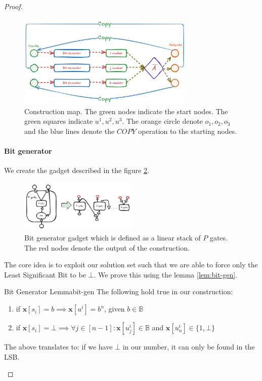 \begin{proof}
\begin{figure}[h!]
    \centering
    \includegraphics[width=0.75\textwidth]{assets/reduction_sketch.png}
    \caption{Construction map. The green nodes indicate the start nodes. The green squares indicate $u^1, u^2, u^3$. The orange circle denote
    $o_1, o_2, o_3$ and the blue lines denote the $\textit{COPY}$ operation to the starting nodes.}
    \label{fig:main-proof:visualisation}
\end{figure}


\paragraph{Bit generator}

We create the gadget described in the figure \ref{fig:main-proof:purification}.

\begin{figure}[h!]
    \centering
    \includegraphics[width=0.5\textwidth, clip]{assets/purification_generator.png}
    \caption{Bit generator gadget which is defined as a linear stack of $P$ gates. The red nodes denote the output of the construction.} 
    \label{fig:main-proof:purification}
\end{figure}
\FloatBarrier

The core idea is to exploit our solution set such that we are able to force only the Least Significant Bit to 
be $\bot$. We prove this using the lemma \ref{lem:bit-gen}.

\begin{lemmabox}{Bit Generator Lemma}{bit-gen}
    The following hold true in our construction:
    \begin{enumerate}
        \item if $\mathbf{x}[s_i] = b \implies \mathbf{x}[u^i] = b^n$, given $b \in \mathbb{B}$
        \item if $\mathbf{x}[s_i] = \bot \implies \forall j \in [n-1]: \mathbf{x}[u^i_j] \in \mathbb{B}$ and $\mathbf{x}[u^i_{n}] \in \{1, \bot\}$
    \end{enumerate}
    The above translates to: if we have $\bot$ in our number, it can only be found in the LSB.
\end{lemmabox}


\end{proof}
